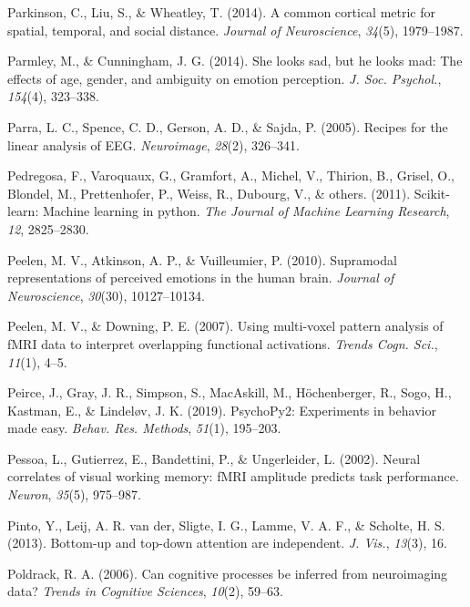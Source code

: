 \documentclass[12pt,american,a4paper,oneside,]{memoir} %
\begin{document}
\leavevmode\hypertarget{ref-parkinson2014common}{}%
Parkinson, C., Liu, S., \& Wheatley, T. (2014). A common cortical metric for spatial, temporal, and social distance. \emph{Journal of Neuroscience}, \emph{34}(5), 1979--1987.

\leavevmode\hypertarget{ref-Parmley2014-nj}{}%
Parmley, M., \& Cunningham, J. G. (2014). She looks sad, but he looks mad: The effects of age, gender, and ambiguity on emotion perception. \emph{J. Soc. Psychol.}, \emph{154}(4), 323--338.

\leavevmode\hypertarget{ref-Parra2005-um}{}%
Parra, L. C., Spence, C. D., Gerson, A. D., \& Sajda, P. (2005). Recipes for the linear analysis of EEG. \emph{Neuroimage}, \emph{28}(2), 326--341.

\leavevmode\hypertarget{ref-pedregosa2011scikit}{}%
Pedregosa, F., Varoquaux, G., Gramfort, A., Michel, V., Thirion, B., Grisel, O., Blondel, M., Prettenhofer, P., Weiss, R., Dubourg, V., \& others. (2011). Scikit-learn: Machine learning in python. \emph{The Journal of Machine Learning Research}, \emph{12}, 2825--2830.

\leavevmode\hypertarget{ref-peelen2010supramodal}{}%
Peelen, M. V., Atkinson, A. P., \& Vuilleumier, P. (2010). Supramodal representations of perceived emotions in the human brain. \emph{Journal of Neuroscience}, \emph{30}(30), 10127--10134.

\leavevmode\hypertarget{ref-Peelen2007-ew}{}%
Peelen, M. V., \& Downing, P. E. (2007). Using multi-voxel pattern analysis of fMRI data to interpret overlapping functional activations. \emph{Trends Cogn. Sci.}, \emph{11}(1), 4--5.

\leavevmode\hypertarget{ref-Peirce2019-rj}{}%
Peirce, J., Gray, J. R., Simpson, S., MacAskill, M., Höchenberger, R., Sogo, H., Kastman, E., \& Lindeløv, J. K. (2019). PsychoPy2: Experiments in behavior made easy. \emph{Behav. Res. Methods}, \emph{51}(1), 195--203.

\leavevmode\hypertarget{ref-Pessoa2002-tb}{}%
Pessoa, L., Gutierrez, E., Bandettini, P., \& Ungerleider, L. (2002). Neural correlates of visual working memory: fMRI amplitude predicts task performance. \emph{Neuron}, \emph{35}(5), 975--987.

\leavevmode\hypertarget{ref-Pinto2013-kh}{}%
Pinto, Y., Leij, A. R. van der, Sligte, I. G., Lamme, V. A. F., \& Scholte, H. S. (2013). Bottom-up and top-down attention are independent. \emph{J. Vis.}, \emph{13}(3), 16.

\leavevmode\hypertarget{ref-poldrack2006can}{}%
Poldrack, R. A. (2006). Can cognitive processes be inferred from neuroimaging data? \emph{Trends in Cognitive Sciences}, \emph{10}(2), 59--63.
\end{document}
